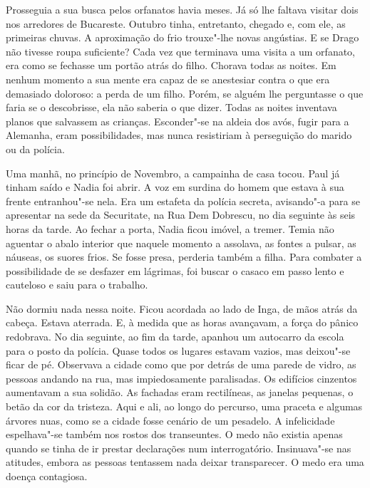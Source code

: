 \bigskip

Prosseguia a sua busca pelos orfanatos havia meses. Já só lhe faltava
visitar dois nos arredores de Bucareste. Outubro tinha, entretanto,
chegado e, com ele, as primeiras chuvas. A aproximação do frio
trouxe"-lhe novas angústias. E se Drago não tivesse roupa suficiente?
Cada vez que terminava uma visita a um orfanato, era como se fechasse um
portão atrás do filho. Chorava todas as noites. Em nenhum momento a sua
mente era capaz de se anestesiar contra o que era demasiado doloroso:
a perda de um filho. Porém, se alguém lhe perguntasse o que faria se o
descobrisse, ela não saberia o que dizer. Todas as noites inventava
planos que salvassem as crianças. Esconder"-se na aldeia dos avós, fugir
para a Alemanha, eram possibilidades, mas nunca resistiriam à
perseguição do marido ou da polícia.

Uma manhã, no princípio de Novembro, a campainha
de casa tocou. Paul já tinham saído e Nadia foi abrir. A voz em surdina
do homem que estava à sua frente entranhou"-se nela. Era um estafeta da polícia secreta, avisando"-a para se
apresentar na sede da Securitate, na Rua Dem Dobrescu, no dia seguinte
às seis horas da tarde. Ao fechar a porta, Nadia ficou imóvel, a tremer.
Temia não aguentar
o abalo interior que naquele momento a assolava, as fontes a pulsar, as
náuseas, os suores frios. Se fosse presa, perderia também a filha. Para
combater a possibilidade de se desfazer em lágrimas, foi buscar o
casaco em passo lento e cauteloso e saiu para o trabalho.

\bigskip

Não dormiu nada nessa noite. Ficou acordada ao lado de Inga, de mãos
atrás da cabeça. Estava aterrada. E, à medida que as horas avançavam, a
força do pânico redobrava. No dia seguinte, ao fim da tarde, apanhou
um autocarro da escola para o posto da polícia. Quase todos os lugares
estavam vazios, mas deixou"-se ficar de pé. Observava a cidade como que
por detrás de uma parede de vidro, as pessoas andando na rua, mas
impiedosamente paralisadas. Os edifícios cinzentos aumentavam a sua
solidão. As fachadas eram rectilíneas, as janelas pequenas, o betão da
cor da tristeza. Aqui e ali, ao longo do percurso, uma praceta e
algumas árvores nuas, como se a cidade fosse cenário de um pesadelo. A
infelicidade espelhava"-se também nos rostos dos transeuntes. O medo
não existia apenas quando se tinha de ir prestar declarações num
interrogatório. Insinuava"-se nas atitudes, embora as pessoas tentassem
nada deixar transparecer. O medo era uma doença contagiosa.


